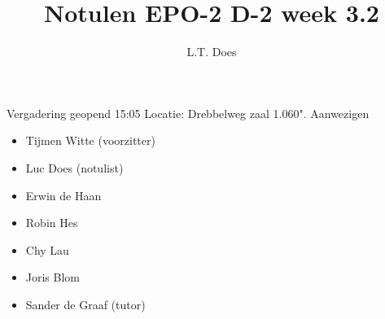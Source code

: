 \documentclass[dutch]{article}
\begin{document}
\title{Notulen EPO-2 D-2 week 3.2}
\author{L.T. Does}

\maketitle
\noindent
Vergadering geopend 15:05 \newline
Locatie: Drebbelweg zaal 1.060".\newline
\newline
Aanwezigen
\begin{itemize}
\item Tijmen Witte (voorzitter)
\item Luc Does (notulist)
\item Erwin de Haan
\item Robin Hes
\item Chy Lau
\item Joris Blom
\item Sander de Graaf (tutor)
\end{itemize}
\end{document}
